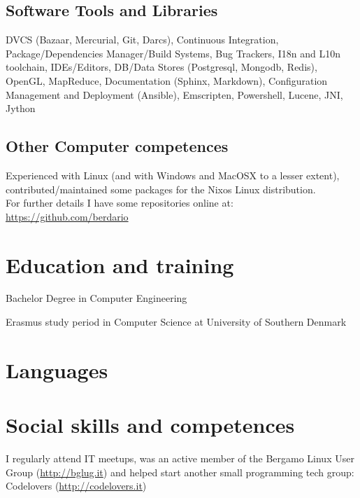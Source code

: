 \documentclass[helvetica,narrow,english,booktabs,a4paper]{moderncv}
\begin{document}
  \clearpage
  \subsection{Software Tools and Libraries}
  DVCS (Bazaar, Mercurial, Git, Darcs), Continuous Integration, Package/Dependencies Manager/Build Systems, Bug
  Trackers, I18n and L10n toolchain, IDEs/Editors, DB/Data Stores
  (Postgresql, Mongodb, Redis), OpenGL, MapReduce, Documentation (Sphinx, Markdown),
  Configuration Management and Deployment (Ansible), Emscripten, Powershell, Lucene, JNI, Jython
  \subsection{Other Computer competences}
  Experienced with Linux (and with Windows and MacOSX to a lesser extent), contributed/maintained some packages for the Nixos Linux distribution.\\
  For further details I have some repositories online at: \url{https://github.com/berdario}

  \section{Education and training}
  Bachelor Degree in Computer Engineering\\

  Erasmus study period in Computer Science at University of Southern Denmark\\

  \section{Languages}

  \section{Social skills and competences}
  I regularly attend IT meetups, was an active member of the Bergamo Linux User Group (\url{http://bglug.it}) and helped start another small programming tech group: Codelovers (\url{http://codelovers.it})
\end{document}
